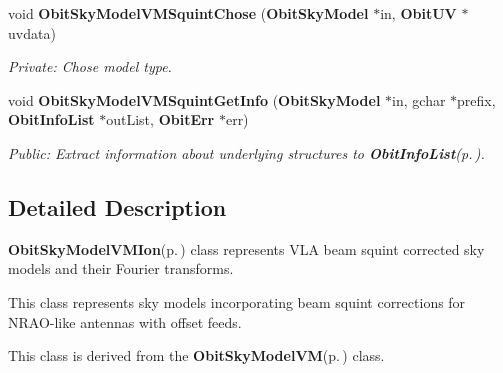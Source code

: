 \begin{CompactItemize}
void {\bf Obit\-Sky\-Model\-VMSquint\-Chose} ({\bf Obit\-Sky\-Model} $\ast$in, {\bf Obit\-UV} $\ast$uvdata)
\begin{CompactList}\small\item\em Private: Chose model type. \item\end{CompactList}\item 
void {\bf Obit\-Sky\-Model\-VMSquint\-Get\-Info} ({\bf Obit\-Sky\-Model} $\ast$in, gchar $\ast$prefix, {\bf Obit\-Info\-List} $\ast$out\-List, {\bf Obit\-Err} $\ast$err)
\begin{CompactList}\small\item\em Public: Extract information about underlying structures to {\bf Obit\-Info\-List}{\rm (p.\,\pageref{structObitInfoList})}. \item\end{CompactList}\end{CompactItemize}


\subsection{Detailed Description}
{\bf Obit\-Sky\-Model\-VMIon}{\rm (p.\,\pageref{structObitSkyModelVMIon})} class represents VLA beam squint corrected sky models and their Fourier transforms. 

This class represents sky models incorporating beam squint corrections for NRAO-like antennas with offset feeds.

This class is derived from the {\bf Obit\-Sky\-Model\-VM}{\rm (p.\,\pageref{structObitSkyModelVM})} class.

